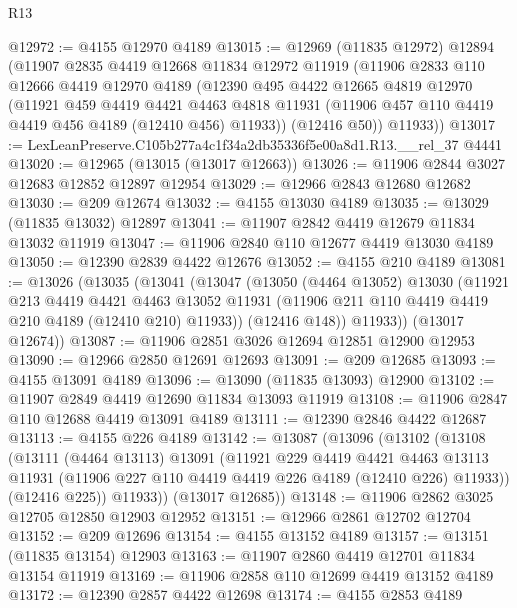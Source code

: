 \begin{lexlean}{R13}
\begin{coremodule}
@12972 := @4155 @12970 @4189
@13015 := @12969
    (@11835 @12972)
    @12894
    (@11907
      @2835
      @4419
      @12668
      @11834
      @12972
      @11919
      (@11906
        @2833
        @110
        @12666
        @4419
        @12970
        @4189
        (@12390
          @495
          @4422
          @12665
          @4819
          @12970
          (@11921
            @459
            @4419
            @4421
            @4463
            @4818
            @11931
            (@11906 @457 @110 @4419 @4419 @456 @4189 (@12410 @456) @11933))
          (@12416 @50))
        @11933))
@13017 := LexLeanPreserve.C105b277a4c1f34a2db35336f5e00a8d1.R13.__rel_37 @4441
@13020 := @12965 (@13015 (@13017 @12663))
@13026 := @11906 @2844 @3027 @12683 @12852 @12897 @12954
@13029 := @12966 @2843 @12680 @12682
@13030 := @209 @12674
@13032 := @4155 @13030 @4189
@13035 := @13029 (@11835 @13032) @12897
@13041 := @11907 @2842 @4419 @12679 @11834 @13032 @11919
@13047 := @11906 @2840 @110 @12677 @4419 @13030 @4189
@13050 := @12390 @2839 @4422 @12676
@13052 := @4155 @210 @4189
@13081 := @13026
    (@13035
      (@13041
        (@13047
          (@13050
            (@4464 @13052)
            @13030
            (@11921
              @213
              @4419
              @4421
              @4463
              @13052
              @11931
              (@11906 @211 @110 @4419 @4419 @210 @4189 (@12410 @210) @11933))
            (@12416 @148))
          @11933))
      (@13017 @12674))
@13087 := @11906 @2851 @3026 @12694 @12851 @12900 @12953
@13090 := @12966 @2850 @12691 @12693
@13091 := @209 @12685
@13093 := @4155 @13091 @4189
@13096 := @13090 (@11835 @13093) @12900
@13102 := @11907 @2849 @4419 @12690 @11834 @13093 @11919
@13108 := @11906 @2847 @110 @12688 @4419 @13091 @4189
@13111 := @12390 @2846 @4422 @12687
@13113 := @4155 @226 @4189
@13142 := @13087
    (@13096
      (@13102
        (@13108
          (@13111
            (@4464 @13113)
            @13091
            (@11921
              @229
              @4419
              @4421
              @4463
              @13113
              @11931
              (@11906 @227 @110 @4419 @4419 @226 @4189 (@12410 @226) @11933))
            (@12416 @225))
          @11933))
      (@13017 @12685))
@13148 := @11906 @2862 @3025 @12705 @12850 @12903 @12952
@13151 := @12966 @2861 @12702 @12704
@13152 := @209 @12696
@13154 := @4155 @13152 @4189
@13157 := @13151 (@11835 @13154) @12903
@13163 := @11907 @2860 @4419 @12701 @11834 @13154 @11919
@13169 := @11906 @2858 @110 @12699 @4419 @13152 @4189
@13172 := @12390 @2857 @4422 @12698
@13174 := @4155 @2853 @4189

\end{coremodule}
\end{lexlean}
